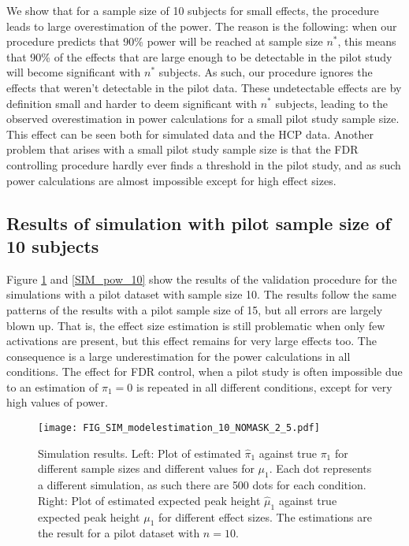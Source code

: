 We show that for a sample size of 10 subjects for small effects, the procedure leads to large overestimation of the power.  The reason is the following: when our procedure predicts that 90\% power will be reached at sample size $n^*$, this means that 90\% of the effects that are large enough to be detectable in the pilot study will become significant with $n^*$ subjects.  As such, our procedure ignores the effects that weren't detectable in the pilot data.  These undetectable effects are by definition small and harder to deem significant with $n^*$ subjects, leading to the observed overestimation in power calculations for a small pilot study sample size.  This effect can be seen both for simulated data and the HCP data.
Another problem that arises with a small pilot study sample size is that the FDR controlling procedure hardly ever finds a threshold in the pilot study, and as such power calculations are almost impossible except for high effect sizes.


\subsection{Results of simulation with pilot sample size of 10 subjects}

Figure \ref{SIM_model_10} and \ref{SIM_pow_10} show the results of the validation procedure for the simulations with a pilot dataset with sample size 10.  The results follow the same patterns of the results with a pilot sample size of 15, but all errors are largely blown up.  That is, the effect size estimation is still problematic when only few activations are present, but this effect remains for very large effects too.  The consequence is a large underestimation for the power calculations in all conditions.  The effect for FDR control, when a pilot study is often impossible due to an estimation of $\pi_1=0$ is repeated in all different conditions, except for very high values of power.

\begin{center}
\begin{figure}[h]
\texttt{[image: FIG\_SIM\_modelestimation\_10\_NOMASK\_2\_5.pdf]}
\caption{Simulation results.  Left: Plot of estimated $\hat\pi_1$ against true $\pi_1$ for different sample sizes and different values for $\mu_1$. Each dot represents a different simulation, as such there are 500 dots for each condition.  Right: Plot of estimated expected peak height $\hat\mu_1$ against true expected peak height $\mu_1$ for different effect sizes. The estimations are the result for a pilot dataset with $n=10$.  \label{SIM_model_10}}
\end{figure}
\end{center}

